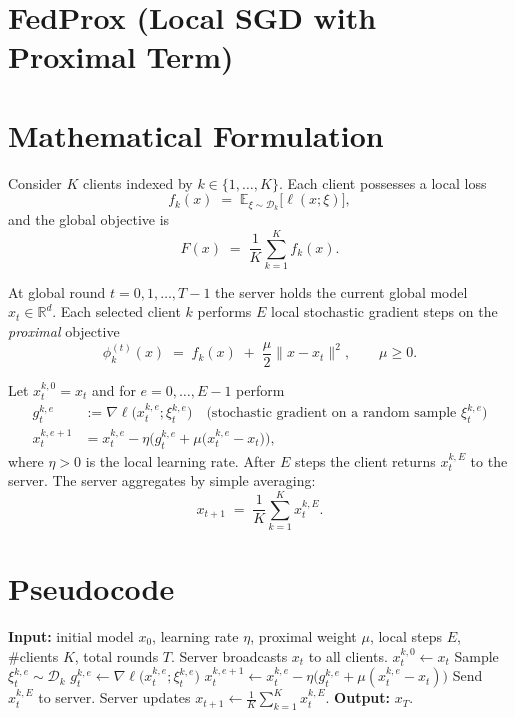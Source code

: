 \documentclass{article}
\begin{document}
\section*{FedProx (Local SGD with Proximal Term)}

\section*{Mathematical Formulation}
Consider $K$ clients indexed by $k\in\{1,\dots,K\}$.  
Each client possesses a local loss 
\[
f_k(x)\;=\;\mathbb{E}_{\xi\sim\mathcal{D}_k}\big[\ell(x;\xi)\big],
\]
and the global objective is 
\[
F(x)\;=\;\frac{1}{K}\sum_{k=1}^{K}f_k(x).
\]

At global round $t=0,1,\dots,T-1$ the server holds the current global model $x_t\in\mathbb{R}^d$.  
Each selected client $k$ performs $E$ local stochastic gradient steps on the \emph{proximal} objective
\[
\phi_{k}^{(t)}(x)\;=\;f_k(x)\;+\;\frac{\mu}{2}\|x-x_t\|^{2},
\qquad\mu\ge 0.
\tag{1}
\]

Let $x_{t}^{k,0}=x_t$ and for $e=0,\dots,E-1$ perform
\[
\begin{aligned}
g_{t}^{k,e}&:=\nabla\ell\big(x_{t}^{k,e};\xi_{t}^{k,e}\big) \quad
\text{(stochastic gradient on a random sample }\xi_{t}^{k,e})\\[2mm]
x_{t}^{k,e+1}&=x_{t}^{k,e}-\eta\Big(g_{t}^{k,e}+\mu\big(x_{t}^{k,e}-x_t\big)\Big),
\tag{2}
\end{aligned}
\]
where $\eta>0$ is the local learning rate.  
After $E$ steps the client returns $x_{t}^{k,E}$ to the server.  
The server aggregates by simple averaging:
\[
x_{t+1}\;=\;\frac{1}{K}\sum_{k=1}^{K}x_{t}^{k,E}.
\tag{3}
\]

\section*{Pseudocode}
\begin{algorithm}[H]
\caption{FedProx (Local SGD with Proximal Regularization)}
\begin{algorithmic}[1]
\State \textbf{Input:} initial model $x_0$, learning rate $\eta$, proximal weight $\mu$, local steps $E$, #clients $K$, total rounds $T$.
    \State Server broadcasts $x_t$ to all clients.
        \State $x_{t}^{k,0}\gets x_t$
            \State Sample $\xi_{t}^{k,e}\sim\mathcal{D}_k$
            \State $g_{t}^{k,e}\gets\nabla\ell\big(x_{t}^{k,e};\xi_{t}^{k,e}\big)$
            \State $x_{t}^{k,e+1}\gets x_{t}^{k,e}-\eta\big(g_{t}^{k,e}+\mu(x_{t}^{k,e}-x_t)\big)$
        \EndFor
        \State Send $x_{t}^{k,E}$ to server.
    \EndFor
    \State Server updates $x_{t+1}\gets \frac{1}{K}\sum_{k=1}^{K}x_{t}^{k,E}$.
\EndFor
\State \textbf{Output:} $x_T$.
\end{algorithmic}
\end{algorithm}
\end{document}
